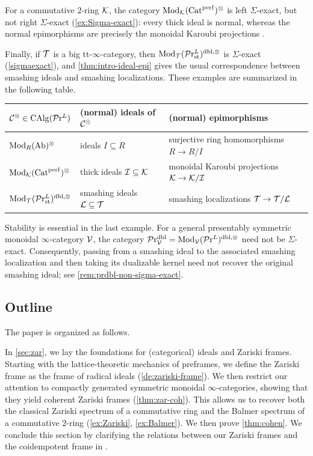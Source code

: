 \documentclass[10pt,a4paper,oneside]{article}
\begin{document}
For a commutative $2$-ring $\mathcal{K}$, the category $\operatorname{Mod}_{\mathcal{K}}(\operatorname{Cat}^{\operatorname{perf}})^\otimes$ is left $\Sigma$-exact, but not right $\Sigma$-exact (\cref{ex:Sigma-exact}): every thick ideal is normal, whereas the normal epimorphisms are precisely the monoidal Karoubi projections .

Finally, if $\mathcal{T}$ is a big tt-$\infty$-category, then $\operatorname{Mod}_\mathcal{T}(\mathcal{P}\mathrm{r}_{\operatorname{st}}^L)^{\operatorname{dbl},\otimes}$ is $\Sigma$-exact (\cref{sigmaexact}), and \cref{thm:intro-ideal-epi} gives the usual correspondence between smashing ideals and smashing localizations. These examples are summarized in the following table.

\begin{center}
\begin{tabularx}{\textwidth}{p{3cm} p{4cm} X}
\toprule
$\mathcal{C}^\otimes \in \operatorname{CAlg}(\mathcal{P}\mathrm{r}^L)$
& (normal) ideals of $\mathcal{C}^\otimes$
& (normal) epimorphisms \\  %
\midrule

$\operatorname{Mod}_{R}(\operatorname{Ab})^\otimes$ 
& ideals $I \subseteq R$
& surjective ring homomorphisms $R \to R/I$ \\

\addlinespace

$\operatorname{Mod}_{\mathcal{K}}(\operatorname{Cat}^{\operatorname{perf}})^\otimes$ 
& thick ideals $\mathcal{I} \subseteq \mathcal{K}$ 
& monoidal Karoubi projections $\mathcal{K} \to \mathcal{K}/\mathcal{I}$ \\

\addlinespace

$\operatorname{Mod}_\mathcal{T}(\mathcal{P}\mathrm{r}_{\operatorname{st}}^L)^{\operatorname{dbl},\otimes}$ 
& smashing ideals $\mathcal{L} \subseteq \mathcal{T}$
& smashing localizations $\mathcal{T} \to \mathcal{T}/\mathcal{L}$ \\
\bottomrule
\end{tabularx}
\end{center}

Stability is essential in the last example. For a general presentably symmetric monoidal $\infty$-category $\mathcal{V}$, the category $\mathcal{P}\mathrm{r}_{\mathcal{V}}^{\operatorname{dbl}}=\operatorname{Mod}_\mathcal{V}(\mathcal{P}\mathrm{r}^L)^{\operatorname{dbl},\otimes}$ need not be $\Sigma$-exact. Consequently, passing from a smashing ideal to the associated smashing localization and then taking its dualizable kernel need not recover the original smashing ideal; see \cref{rem:prdbl-non-sigma-exact}.

\subsection*{Outline}
The paper is organized as follows.

In \cref{sec:zar}, we lay the foundations for (categorical) ideals and Zariski frames. Starting with the lattice-theoretic mechanics of preframes, we define the Zariski frame as the frame of radical ideals (\cref{de:zariski-frame}). We then restrict our attention to compactly generated symmetric monoidal $\infty$-categories, showing that they yield coherent Zariski frames (\cref{thm:zar-coh}). This allows us to recover both the classical Zariski spectrum of a commutative ring and the Balmer spectrum of a commutative $2$-ring (\cref{ex:Zariski}, \cref{ex:Balmer}). We then prove \cref{thm:cohen}. We conclude this section by clarifying the relations between our Zariski frames and the coidempotent frame in \cite{aoki2023sheaves}.
\end{document}
